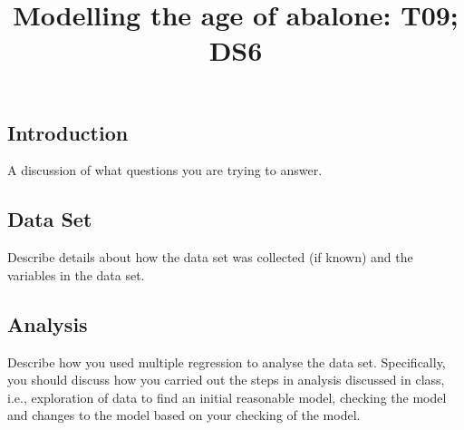 \documentclass[9pt,twocolumn,twoside,]{pnas-new}
\title{Modelling the age of abalone: T09; DS6}
\author[]{}
\begin{document}
\verticaladjustment{-2pt}

\maketitle
\thispagestyle{firststyle}


\acknow{}

\subsection*{Introduction}\label{introduction}

A discussion of what questions you are trying to answer.

\subsection*{Data Set}\label{data-set}

Describe details about how the data set was collected (if known) and the
variables in the data set.

\subsection*{Analysis}\label{analysis}

Describe how you used multiple regression to analyse the data set.
Specifically, you should discuss how you carried out the steps in
analysis discussed in class, i.e., exploration of data to find an
initial reasonable model, checking the model and changes to the model
based on your checking of the model.
\end{document}
